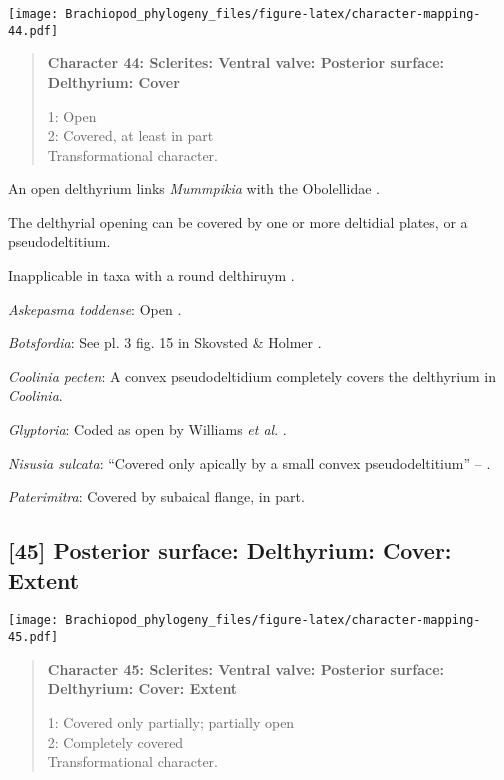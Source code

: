 \documentclass[openany]{book}
\theoremstyle{definition}
\theoremstyle{definition}
\theoremstyle{definition}
\theoremstyle{remark}
\begin{document}
\texttt{[image: Brachiopod\_phylogeny\_files/figure-latex/character-mapping-44.pdf]}

\begin{quote}
\textbf{Character 44: Sclerites: Ventral valve: Posterior surface:
Delthyrium: Cover}

1: Open\\
2: Covered, at least in part\\
Transformational character.
\end{quote}

An open delthyrium links \emph{Mummpikia} with the Obolellidae
\citep{Balthasar2008iMummpikia}.

The delthyrial opening can be covered by one or more deltidial plates,
or a pseudodeltitium.

Inapplicable in taxa with a round delthiruym \citep[generated by
overgrowth of the delthyrial opening by posterolateral parts of the
shell, per][]{Popov1992TheCambrian}.

\hypertarget{Askepasma_toddense-coding-44}{}
\emph{Askepasma toddense}: Open \citep{Topper2013Theoldest}.

\hypertarget{Botsfordia-coding-44}{}
\emph{Botsfordia}: See pl. 3 fig. 15 in Skovsted \& Holmer
\citeyearpar{Skovsted2005EarlyCambrian}.

\hypertarget{Coolinia_pecten-coding-44}{}
\emph{Coolinia pecten}: A convex pseudodeltidium completely covers the
delthyrium in \emph{Coolinia}.

\hypertarget{Glyptoria-coding-44}{}
\emph{Glyptoria}: Coded as open by Williams \emph{et al}.
\citeyearpar{Williams1998Thediversity}.

\hypertarget{Nisusia_sulcata-coding-44}{}
\emph{Nisusia sulcata}: ``Covered only apically by a small convex
pseudodeltitium'' -- \citet{Holmer2018Evolutionarysignificance}.

\hypertarget{Paterimitra-coding-44}{}
\emph{Paterimitra}: Covered by subaical flange, in part.

\subsection*{{[}45{]} Posterior surface: Delthyrium: Cover:
Extent}\label{posterior-surface-delthyrium-cover-extent}

\texttt{[image: Brachiopod\_phylogeny\_files/figure-latex/character-mapping-45.pdf]}

\begin{quote}
\textbf{Character 45: Sclerites: Ventral valve: Posterior surface:
Delthyrium: Cover: Extent}

1: Covered only partially; partially open\\
2: Completely covered\\
Transformational character.
\end{quote}
\end{document}
